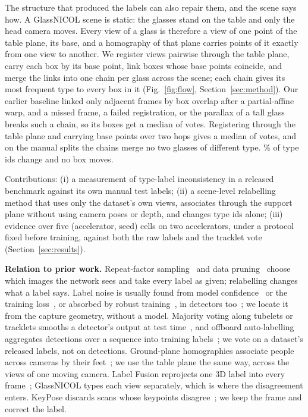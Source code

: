 \documentclass{article}
\begin{document}
The structure that produced the labels can also repair them, and the scene says how. A GlassNICOL scene is static: the glasses stand on the table and only the head camera moves. Every view of a glass is therefore a view of one point of the table plane, its base, and a homography of that plane carries points of it exactly from one view to another. We register views pairwise through the table plane, carry each box by its base point, link boxes whose base points coincide, and merge the links into one chain per glass across the scene; each chain gives its most frequent type to every box in it (Fig.~\ref{fig:flow}, Section~\ref{sec:method}). Our earlier baseline linked only adjacent frames by box overlap after a partial-affine warp, and a missed frame, a failed registration, or the parallax of a tall glass breaks such a chain, so its boxes get a median of \TrkMedianVotes{} votes. Registering through the table plane and carrying base points over two hops gives a median of \SceneMedianLen{} votes, and on the manual splits the chains merge no two glasses of different type. \SceneChangedPct\% of type ids change and no box moves.

Contributions: (i) a measurement of type-label inconsistency in a released benchmark against its own manual test labels; (ii) a scene-level relabelling method that uses only the dataset's own views, associates through the support plane without using camera poses or depth, and changes type ids alone; (iii) evidence over five (accelerator, seed) cells on two accelerators, under a protocol fixed before training, against both the raw labels and the tracklet vote (Section~\ref{sec:results}).

\noindent\textbf{Relation to prior work.} Repeat-factor sampling~\cite{gupta2019lvis} and data pruning~\cite{paul2021datadiet,sorscher2022pruning} choose which images the network sees and take every label as given; relabelling changes what a label says. Label noise is usually found from model confidence~\cite{northcutt2021confident,northcutt2021errors} or the training loss~\cite{schubert2024labelerrors}, or absorbed by robust training~\cite{song2023noisysurvey}, in detectors too~\cite{liu2022nlte}; we locate it from the capture geometry, without a model. Majority voting along tubelets or tracklets smooths a detector's output at test time~\cite{kang2016tcnn,han2016seqnms,tripathi2016propagation,chen2016pseudotracklet}, and offboard auto-labelling aggregates detections over a sequence into training labels~\cite{qi2021offboard}; we vote on a dataset's released labels, not on detections. Ground-plane homographies associate people across cameras by their feet~\cite{khan2006homography}; we use the table plane the same way, across the views of one moving camera. Label Fusion reprojects one 3D label into every frame~\cite{marion2018labelfusion}; GlassNICOL types each view separately, which is where the disagreement enters. KeyPose discards scans whose keypoints disagree~\cite{liu2020keypose}; we keep the frame and correct the label.
\end{document}
